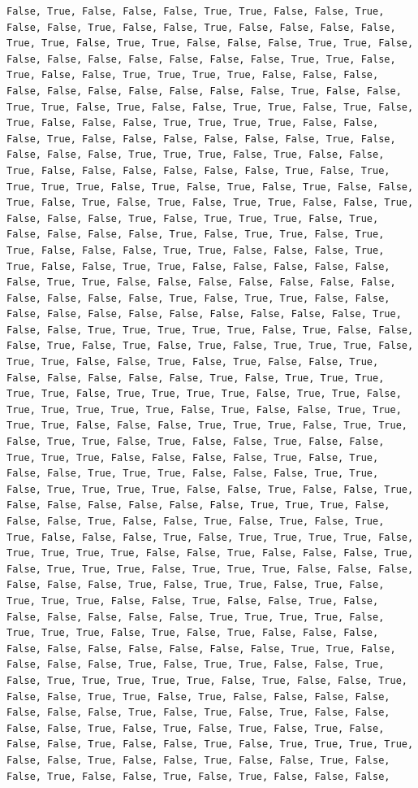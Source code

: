 \documentclass[
  letterpaper,
  DIV=11,
  numbers=noendperiod]{scrartcl}
\begin{document}
\begin{verbatim}
False, True, False, False, False, True, True, False, False, True, False, False, True, False, False, True, False, False, False, False, True, True, False, True, True, False, False, False, True, True, False, False, False, False, False, False, False, False, True, True, False, True, False, False, True, True, True, True, False, False, False, False, False, False, False, False, False, False, True, False, False, True, True, False, True, False, False, True, True, False, True, False, True, False, False, False, True, True, True, True, False, False, False, True, False, False, False, False, False, False, True, False, False, False, False, True, True, True, False, True, False, False, True, False, False, False, False, False, False, True, False, True, True, True, True, False, True, False, True, False, True, False, False, True, False, True, False, True, False, True, True, False, False, True, False, False, False, True, False, True, True, True, False, True, False, False, False, False, True, False, True, True, False, True, True, False, False, False, True, True, False, False, False, True, True, False, False, True, True, False, False, False, False, False, False, True, True, False, False, False, False, False, False, False, False, False, False, False, True, False, True, True, False, False, False, False, False, False, False, False, False, False, False, True, False, False, True, True, True, True, True, False, True, False, False, False, True, False, True, False, True, False, True, True, True, False, True, True, False, False, True, False, True, False, False, True, False, False, False, False, False, True, False, True, True, True, True, True, False, True, True, True, True, False, True, True, False, True, True, True, True, True, False, True, False, False, True, True, True, True, False, False, False, True, True, True, False, True, True, False, True, True, False, True, False, False, True, False, False, True, True, True, False, False, False, False, True, False, True, False, False, True, True, True, False, False, False, True, True, False, True, True, True, True, False, False, True, False, False, True, False, False, False, False, False, False, True, True, True, False, False, False, True, False, False, True, False, True, False, True, True, False, False, False, True, False, True, True, True, True, False, True, True, True, True, False, False, True, False, False, False, True, False, True, True, True, False, True, True, True, False, False, False, False, False, False, True, False, True, True, False, True, False, True, True, True, False, False, True, False, False, True, False, False, False, False, False, False, True, True, True, True, False, True, True, True, False, True, False, True, False, False, False, False, False, False, False, False, False, False, True, True, False, False, False, False, True, False, True, True, False, False, True, False, True, True, True, True, True, False, True, False, False, True, False, False, True, True, False, True, False, False, False, False, False, False, False, True, False, True, False, True, False, False, False, False, True, False, True, False, True, False, True, False, False, False, True, False, False, True, False, True, True, True, True, False, False, True, False, False, True, False, False, True, False, False, True, False, False, True, False, True, False, False, False, 
\end{verbatim}
\end{document}

